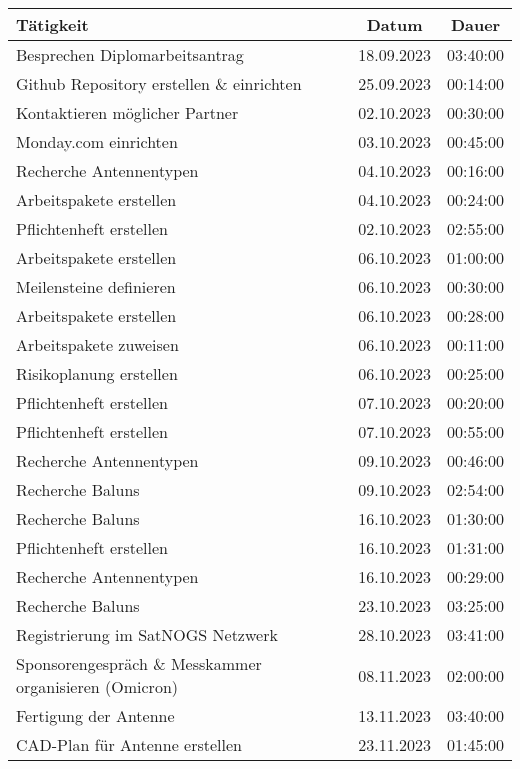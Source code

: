 \begin{longtable}{|l|c|c|}
	\hline
	\textbf{Tätigkeit} & \textbf{Datum} & \textbf{Dauer} \\
	\hline
	Besprechen Diplomarbeitsantrag & 18.09.2023 & 03:40:00 \\
	\hline
	Github Repository erstellen \& einrichten & 25.09.2023 & 00:14:00 \\
	\hline
	Kontaktieren möglicher Partner & 02.10.2023 & 00:30:00 \\
	\hline
	Monday.com einrichten & 03.10.2023 & 00:45:00 \\
	\hline
	Recherche Antennentypen & 04.10.2023 & 00:16:00 \\
	\hline
	Arbeitspakete erstellen & 04.10.2023 & 00:24:00 \\
	\hline
	Pflichtenheft erstellen & 02.10.2023 & 02:55:00 \\
	\hline
	Arbeitspakete erstellen & 06.10.2023 & 01:00:00 \\
	\hline
	Meilensteine definieren & 06.10.2023 & 00:30:00 \\
	\hline
	Arbeitspakete erstellen & 06.10.2023 & 00:28:00 \\
	\hline
	Arbeitspakete zuweisen & 06.10.2023 & 00:11:00 \\
	\hline
	Risikoplanung erstellen & 06.10.2023 & 00:25:00 \\
	\hline
	Pflichtenheft erstellen & 07.10.2023 & 00:20:00 \\
	\hline
	Pflichtenheft erstellen & 07.10.2023 & 00:55:00 \\
	\hline
	Recherche Antennentypen & 09.10.2023 & 00:46:00 \\
	\hline
	Recherche Baluns & 09.10.2023 & 02:54:00 \\
	\hline
	Recherche Baluns & 16.10.2023 & 01:30:00 \\
	\hline
	Pflichtenheft erstellen & 16.10.2023 & 01:31:00 \\
	\hline
	Recherche Antennentypen & 16.10.2023 & 00:29:00 \\
	\hline
	Recherche Baluns & 23.10.2023 & 03:25:00 \\
	\hline
	Registrierung im SatNOGS Netzwerk & 28.10.2023 & 03:41:00 \\
	\hline
	Sponsorengespräch \& Messkammer organisieren (Omicron) & 08.11.2023 & 02:00:00 \\
	\hline
	Fertigung der Antenne & 13.11.2023 & 03:40:00 \\
	\hline
	CAD-Plan für Antenne erstellen & 23.11.2023 & 01:45:00 \\

\end{longtable}
